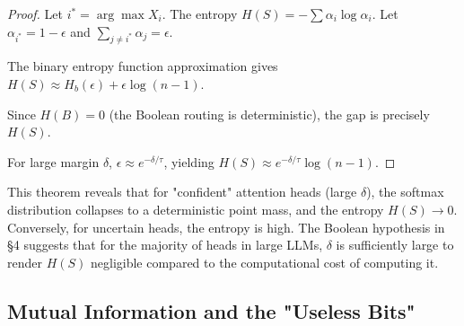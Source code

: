 \begin{proof}






Let $i^* = \arg\max X_i$. The entropy $H(S) = -\sum \alpha_i \log \alpha_i$. Let $\alpha_{i^*} = 1 - \epsilon$ and $\sum_{j \neq i^*} \alpha_j = \epsilon$.






The binary entropy function approximation gives $H(S) \approx H_b(\epsilon) + \epsilon \log(n-1)$.






Since $H(B) = 0$ (the Boolean routing is deterministic), the gap is precisely $H(S)$.






For large margin $\delta$, $\epsilon \approx e^{-\delta/\tau}$, yielding $H(S) \approx e^{-\delta/\tau} \log(n-1)$.






\end{proof}













This theorem reveals that for "confident" attention heads (large $\delta$), the softmax distribution collapses to a deterministic point mass, and the entropy $H(S) \to 0$. Conversely, for uncertain heads, the entropy is high. The Boolean hypothesis in \S4 suggests that for the majority of heads in large LLMs, $\delta$ is sufficiently large to render $H(S)$ negligible compared to the computational cost of computing it.













\subsection{Mutual Information and the "Useless Bits"}














